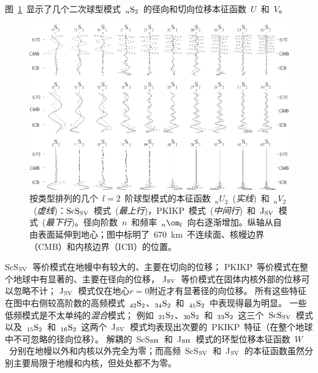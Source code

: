 {图~\ref{fig:ScS&J&PKIKP}~显示了几个二次球型模式~${}_n{\rm S}_2$~的径向和切向位移本征函数~$U$~和~$V$。
\begin{figure}
\begin{center}
\includegraphics{../figures/chap08/fig14.eps}
\end{center}
\caption[ScS&J&PKIKP]{\label{fig:ScS&J&PKIKP}
%
%
%
按类型排列的几个~$l=2$~阶球型模式的本征函数~${}_nU_2$~({\em 实线\/})~和~${}_nV_2$~({\em 虚线\/})：${\rm ScS}_{\rm SV}$~模式~({\em 最上行\/})，PKIKP~模式~({\em 中间行\/})~和~${\rm J}_{\rm SV}$~模式~({\em 最下行\/})。径向阶数~$n$~和频率~${}_n\om_l$~向右逐渐增加。纵轴从自由表面延伸到地心；图中标明了~670~km~不连续面、核幔边界（CMB）和内核边界（ICB）的位置。
}
\end{figure}
ScS${}_{\rm SV}$~等价模式在地幔中有较大的、主要在切向的位移；
%
%
PKIKP~等价模式在整个地球中有显著的、主要在径向的位移，
%
%
J${}_{\rm SV}$~等价模式在固体内核外部的位移可以忽略不计；
%
%
J${}_{\rm SV}$~模式仅在地心$r=0$附近才有显著径的向位移。
所有这些特征在图中右侧较高阶数的高频模式~${}_{42}{\rm S}_2$、${}_{34}{\rm S}_2$~和~${}_{45}{\rm S}_2$~中表现得最为明显。
一些低频模式是不太单纯的{\em 混合\/}模式；
%
%
例如~${}_{21}{\rm S}_2$、${}_{30}{\rm S}_2$~和~${}_{33}{\rm S}_2$~这三个~${\rm ScS}_{\rm SV}$~模式以及~${}_{15}{\rm S}_2$~和~${}_{16}{\rm S}_2$~这两个~J${}_{\rm SV}$~模式均表现出次要的~PKIKP~特征（在整个地球中不可忽略的径向位移）。
解耦的~ScS${}_{\rm SH}$~和~J${}_{\rm SH}$~模式的环型位移本征函数~$W$~分别在地幔以外和内核以外完全为零；而高频~ScS${}_{\rm SV}$~和~J${}_{\rm SV}$~的本征函数虽然分别主要局限于地幔和内核，但处处都不为零。

}
